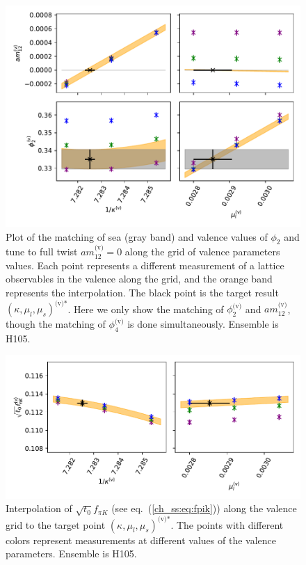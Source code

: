 \begin{figure}
    \centering
    \includegraphics[width=1.\textwidth]{./cap4/figs/matching_H105.pdf}
    \caption{Plot of the matching of sea (gray band) and valence values of $\phi_2$ and tune to full twist $am_{12}^{\textrm{(v)}}=0$ along the grid of valence parameters values. Each point represents a different measurement of a lattice observables in the valence along the grid, and the orange band represents the interpolation. The black point is the target result $\left(\kappa,\mu_l,\mu_s\right)^{\textrm{(v)*}}$. Here we only show the matching of $\phi_2^{\textrm{(v)}}$ and $am_{12}^{\textrm{(v)}}$, though the matching of $\phi_4^{\textrm{(v)}}$ is done simultaneously. Ensemble is H105.}
    \label{ch_ma:fig:match}
\end{figure}

\begin{figure}
    \centering
    \includegraphics[width=1.\textwidth]{./cap4/figs/interp_fpik_H105.pdf}
    \caption{Interpolation of $\sqrt{t_0}f_{\pi K}$ (see eq.~(\ref{ch_ss:eq:fpik})) along the valence grid to the target point $\left(\kappa,\mu_l,\mu_s\right)^{\textrm{(v)*}}$. The points with different colors represent measurements at different values of the valence parameters. Ensemble is H105.}
    \label{ch_ma:fig:fpik_interp}
\end{figure}

